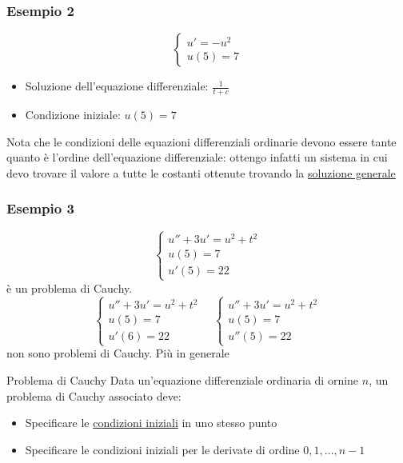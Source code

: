 \subsubsection*{Esempio 2}
\[
	\begin{cases}
		u' = - u^2 \\
		u\left( 5 \right) = 7
	\end{cases}
\]
\begin{itemize}
	\item Soluzione dell'equazione differenziale: $ \frac{1}{t + c} $
	\item Condizione iniziale: $ u\left( 5 \right) = 7 $
\end{itemize}
\hr
Nota che le condizioni delle equazioni differenziali ordinarie devono essere tante quanto è l'ordine dell'equazione differenziale: ottengo infatti un sistema in cui devo trovare il valore a tutte le costanti ottenute trovando la \underline{soluzione generale}
\subsubsection*{Esempio 3}
\[
	\begin{cases}
		u'' + 3 u' = u^2 + t^2 \\
		u \left( 5 \right) = 7 \\
		u' \left( 5 \right) = 22
	\end{cases}
\]
è un problema di Cauchy.
\[
	\begin{cases}
		u'' + 3 u' = u^2 + t^2 \\
		u \left( 5 \right) = 7 \\
		u' \left( 6 \right) = 22
	\end{cases}
	\quad
	\begin{cases}
		u'' + 3 u' = u^2 + t^2 \\
		u \left( 5 \right) = 7 \\
		u'' \left( 5 \right) = 22
	\end{cases}
\]
non sono problemi di Cauchy. Più in generale
\begin{definizione}{Problema di Cauchy}
	Data un'equazione differenziale ordinaria di ornine $ n $, un problema di Cauchy associato deve:
	\begin{itemize}
		\item Specificare le \underline{condizioni iniziali} in uno stesso punto
		\item Specificare le condizioni iniziali per le derivate di ordine $ 0,1,\ldots, n-1 $
	\end{itemize}
\end{definizione}

